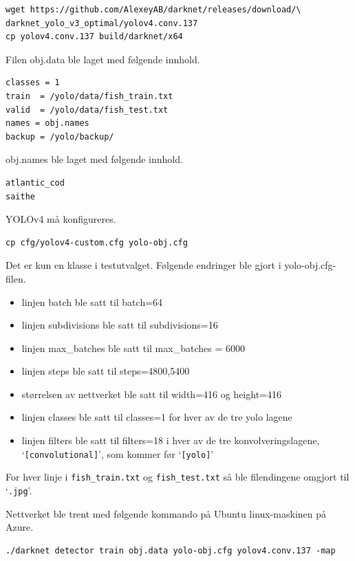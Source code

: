 \begin{verbatim}
wget https://github.com/AlexeyAB/darknet/releases/download/\
darknet_yolo_v3_optimal/yolov4.conv.137
cp yolov4.conv.137 build/darknet/x64
\end{verbatim}

Filen obj.data ble laget med følgende innhold.

\begin{lstlisting}[language={}, caption=obj.data]
classes = 1
train  = /yolo/data/fish_train.txt
valid  = /yolo/data/fish_test.txt
names = obj.names
backup = /yolo/backup/
\end{lstlisting}

obj.names ble laget med følgende innhold.

\begin{lstlisting}[language={}, caption=obj.names]
atlantic_cod
saithe
\end{lstlisting}

YOLOv4 må konfigureres.

\begin{verbatim}
cp cfg/yolov4-custom.cfg yolo-obj.cfg
\end{verbatim}

Det er kun en klasse i testutvalget. Følgende endringer ble gjort i yolo-obj.cfg-filen.

\begin{itemize}
  \item linjen batch ble satt til batch=64
  \item linjen subdivisions ble satt til subdivisions=16
  \item linjen max\_batches ble satt til max\_batches = 6000
  \item linjen steps ble satt til steps=4800,5400
  \item størrelsen av nettverket ble satt til width=416 og height=416
  \item linjen classes ble satt til classes=1 for hver av de tre yolo lagene
  \item linjen filters ble satt til filters=18 i hver av de tre konvolveringslagene, `\texttt{[convolutional]}', som kommer før `\texttt{[yolo]}'
\end{itemize}

For hver linje i \texttt{fish\_train.txt} og \texttt{fish\_test.txt} så ble filendingene omgjort til `\texttt{.jpg}'.

Nettverket ble trent med følgende kommando på Ubuntu linux-maskinen på Azure.

\begin{verbatim}
./darknet detector train obj.data yolo-obj.cfg yolov4.conv.137 -map
\end{verbatim}

